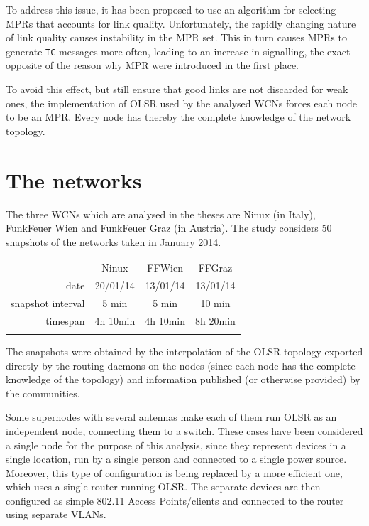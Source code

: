 \documentclass[oneside,openany]{memoir}
\begin{document}
To address this issue, it has been proposed to use an algorithm for
selecting MPRs that accounts for link quality. Unfortunately, the
rapidly changing nature of link quality causes instability in the MPR
set. This in turn causes MPRs to generate \texttt{TC} messages more
often, leading to an increase in signalling, the exact opposite of the
reason why MPR were introduced in the first place.

To avoid this effect, but still ensure that good links are not discarded
for weak ones, the implementation of OLSR used by the analysed WCNs
forces each node to be an MPR. Every node has thereby the complete
knowledge of the network topology.

\chapter{The networks}\label{the-networks}

The three WCNs which are analysed in the theses are Ninux (in Italy),
FunkFeuer Wien and FunkFeuer Graz (in Austria). The study considers 50
snapshots of the networks taken in January 2014.

\begin{longtable}[c]{@{}rccc@{}}
\toprule\addlinespace
& Ninux & FFWien & FFGraz
\\\addlinespace
\midrule\endhead
date & 20/01/14 & 13/01/14 & 13/01/14
\\\addlinespace
snapshot interval & 5 min & 5 min & 10 min
\\\addlinespace
timespan & 4h 10min & 4h 10min & 8h 20min
\\\addlinespace
\bottomrule
\end{longtable}

The snapshots were obtained by the interpolation of the OLSR topology
exported directly by the routing daemons on the nodes (since each node
has the complete knowledge of the topology) and information published
(or otherwise provided) by the communities.

Some supernodes with several antennas make each of them run OLSR as an
independent node, connecting them to a switch. These cases have been
considered a single node for the purpose of this analysis, since they
represent devices in a single location, run by a single person and
connected to a single power source. Moreover, this type of configuration
is being replaced by a more efficient one, which uses a single router
running OLSR. The separate devices are then configured as simple 802.11
Access Points/clients and connected to the router using separate VLANs.
\end{document}
